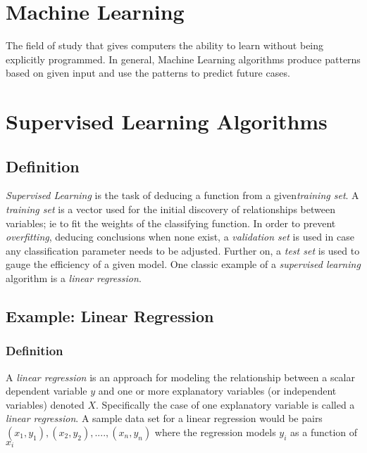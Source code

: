 \documentclass[a4paper]{article}
\begin{document}
\section{Machine Learning}
The field of study that gives computers the ability to learn without being explicitly programmed. In general, Machine Learning algorithms produce patterns based on given input and use the patterns to predict future cases. 

\section{Supervised Learning Algorithms}
\subsection{Definition}
\textit{Supervised Learning} is the task of deducing a function from a given\textit{training set}. \cite{Ng} A \textit{training set} is a vector used for the initial discovery of relationships between variables; ie to fit the weights of the classifying function. In order to prevent \textit{overfitting}, deducing conclusions when none exist, a \textit{validation set} is used in case any classification parameter needs to be adjusted. Further on, a \textit{test set} is used to gauge the efficiency of a given model. One classic example of a \textit{supervised learning} algorithm is a \textit{linear regression}.
\subsection{Example: Linear Regression}
\subsubsection{Definition}
A \textit{linear regression} is an approach for modeling the relationship between a scalar dependent variable $y$ and one or more explanatory variables (or independent variables) denoted $X$. Specifically the case of one explanatory variable is called a \textit{linear regression}. A sample data set for a linear regression would be pairs $(x_1,y_1),(x_2,y_2),....,(x_n,y_n)$ where the regression models $y_i$ as a function of $x_i$
\end{document}
